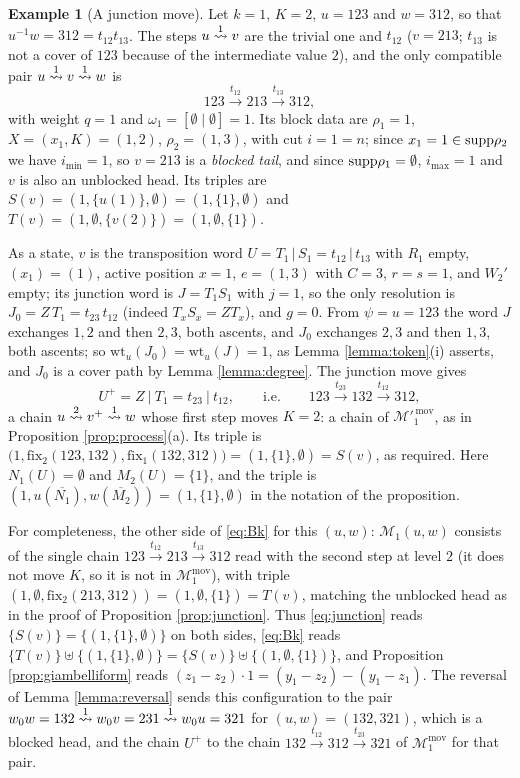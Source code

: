 \documentclass{amsart}
\theoremstyle{definition}
\newtheorem{example}[lemma]{Example}
\theoremstyle{remark}
\numberwithin{equation}{section}
\newcommand{\xrightsquigarrow}[2][]{%
	\mathrel{\mathop{\rightsquigarrow}\limits^{\scriptstyle #2}%
	\ifx\hfuzz#1\hfuzz\else_{\scriptstyle #1}\fi}%
}
\newcommand{\tom}[1]{\ensuremath{\xrightsquigarrow{#1}}}
\newcommand{\fx}{\mathrm{fix}}
\begin{document}
\begin{example}[A junction move] \label{example:junction}
Let $k=1$, $K=2$, $u=123$ and $w=312$, so that $u^{-1}w=312=t_{12}t_{13}$. The steps $u\tom1v$ are the trivial one and $t_{12}$ ($v=213$; $t_{13}$ is not a cover of $123$ because of the intermediate value $2$), and the only compatible pair $u\tom1v\tom1w$ is
$$123\xrightarrow{t_{12}}213\xrightarrow{t_{13}}312,$$
with weight $q=1$ and $\omega_1=[\emptyset\mid\emptyset]=1$. Its block data are $\rho_1=1$, $X=(x_1,K)=(1,2)$, $\rho_2=(1,3)$, with cut $i=1=n$; since $x_1=1\in\mathrm{supp}\rho_2$ we have $i_{\min}=1$, so $v=213$ is a \emph{blocked tail}, and since $\mathrm{supp}\rho_1=\emptyset$, $i_{\max}=1$ and $v$ is also an unblocked head. Its triples are $S(v)=(1,\{u(1)\},\emptyset)=(1,\{1\},\emptyset)$ and $T(v)=(1,\emptyset,\{v(2)\})=(1,\emptyset,\{1\})$.

As a state, $v$ is the transposition word $U=T_1\,|\,S_1=t_{12}\,|\,t_{13}$ with $R_1$ empty, $(x_1)=(1)$, active position $x=1$, $e=(1,3)$ with $C=3$, $r=s=1$, and $W_2'$ empty; its junction word is $J=T_1S_1$ with $j=1$, so the only resolution is $J_0=Z\,T_1=t_{23}\,t_{12}$ (indeed $T_xS_x=ZT_x$), and $g=0$. From $\psi=u=123$ the word $J$ exchanges $1,2$ and then $2,3$, both ascents, and $J_0$ exchanges $2,3$ and then $1,3$, both ascents; so $\mathrm{wt}_u(J_0)=\mathrm{wt}_u(J)=1$, as Lemma \ref{lemma:token}(i) asserts, and $J_0$ is a cover path by Lemma \ref{lemma:degree}. The junction move gives
$$U^+=Z\ \big|\ T_1=t_{23}\ \big|\ t_{12},\qquad\text{i.e.}\qquad 123\xrightarrow{t_{23}}132\xrightarrow{t_{12}}312,$$
a chain $u\tom2v^+\tom1w$ whose first step moves $K=2$: a chain of $\mathcal M'^{\,\mathrm{mov}}_1$, as in Proposition \ref{prop:process}(a). Its triple is $\big(1,\fx_2(123,132),\fx_1(132,312)\big)=(1,\{1\},\emptyset)=S(v)$, as required. Here $N_1(U)=\emptyset$ and $M_2(U)=\{1\}$, and the triple is $(1,u(\overline{N_1}),w(\overline{M_2}))=(1,\{1\},\emptyset)$ in the notation of the proposition.

For completeness, the other side of \eqref{eq:Bk} for this $(u,w)$: $\mathcal M_1(u,w)$ consists of the single chain $123\xrightarrow{t_{12}}213\xrightarrow{t_{13}}312$ read with the second step at level $2$ (it does not move $K$, so it is not in $\mathcal M_1^{\mathrm{mov}}$), with triple $(1,\emptyset,\fx_2(213,312))=(1,\emptyset,\{1\})=T(v)$, matching the unblocked head as in the proof of Proposition \ref{prop:junction}. Thus \eqref{eq:junction} reads $\{S(v)\}=\{(1,\{1\},\emptyset)\}$ on both sides, \eqref{eq:Bk} reads $\{T(v)\}\uplus\{(1,\{1\},\emptyset)\}=\{S(v)\}\uplus\{(1,\emptyset,\{1\})\}$, and Proposition \ref{prop:giambelliform} reads $(z_1-z_2)\cdot1=(y_1-z_2)-(y_1-z_1)$. The reversal of Lemma \ref{lemma:reversal} sends this configuration to the pair $w_0w=132\tom1 w_0v=231\tom1 w_0u=321$ for $(u,w)=(132,321)$, which is a blocked head, and the chain $U^+$ to the chain $132\xrightarrow{t_{12}}312\xrightarrow{t_{23}}321$ of $\mathcal M_1^{\mathrm{mov}}$ for that pair.
\end{example}
\end{document}
